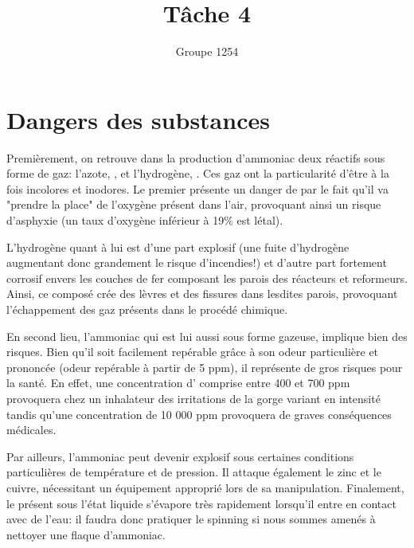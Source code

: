 \documentclass[a4paper,12pt, oneside]{article}
\title{Tâche 4}
\author{Groupe 1254}
\begin{document}
\maketitle
\section{Dangers des substances}
Premièrement, on retrouve dans la production d'ammoniac deux réactifs sous forme de gaz: l'azote, , et l'hydrogène, . Ces gaz ont la particularité d'être à la fois incolores et inodores. Le premier présente un danger de par le fait qu'il va "prendre la place" de l'oxygène présent dans l'air, provoquant ainsi un risque d'asphyxie (un taux d'oxygène inférieur à 19\% est létal). 
		
		L'hydrogène quant à lui est d'une part explosif (une fuite d'hydrogène augmentant donc grandement le risque d'incendies!) et d'autre part fortement corrosif envers les couches de fer composant les parois des réacteurs et reformeurs. Ainsi, ce composé crée des lèvres et des fissures dans lesdites parois, provoquant l'échappement des gaz présents dans le procédé chimique.
		
		En second lieu, l'ammoniac qui est lui aussi sous forme gazeuse, implique bien des risques. Bien qu'il soit facilement repérable grâce à son odeur particulière et prononcée (odeur repérable à partir de 5 ppm), il représente de gros risques pour la santé. En effet, une concentration d' comprise entre 400 et 700 ppm provoquera chez un inhalateur des irritations de la gorge variant en intensité tandis qu'une concentration de 10 000 ppm provoquera de graves conséquences médicales.

		Par ailleurs, l'ammoniac peut devenir explosif sous certaines conditions particulières de température et de pression. Il attaque également le zinc et le cuivre, nécessitant un équipement approprié lors de sa manipulation. Finalement, le  présent sous l'état liquide s'évapore très rapidement lorsqu'il entre en contact avec de l'eau: il faudra donc pratiquer le spinning si nous sommes amenés à nettoyer une  flaque d'ammoniac.
\end{document}
